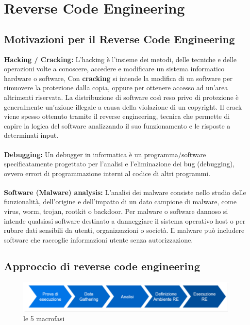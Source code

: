 \documentclass[8pt]{extarticle}
\begin{document}
\section{Reverse Code Engineering}
\subsection{Motivazioni per il Reverse Code Engineering}
\noindent
\textbf{Hacking / Cracking:}
L'hacking è l'insieme dei metodi, delle tecniche e delle operazioni volte a conoscere, accedere e 
modificare un sistema informatico hardware o software, Con \textbf{cracking} si intende la modifica di un 
software per rimuovere la protezione dalla copia, oppure per ottenere accesso ad un'area altrimenti 
riservata. La distribuzione di software così reso privo di protezione è generalmente un'azione 
illegale a causa della violazione di un copyright. Il crack viene spesso ottenuto tramite il 
reverse engineering, tecnica che permette di capire la logica del software analizzando il suo 
funzionamento e le risposte a determinati input.\\\\
\textbf{Debugging:}
Un debugger in informatica è un programma/software specificatamente progettato per l'analisi e 
l'eliminazione dei bug (debugging), ovvero errori di programmazione interni al codice di altri programmi.\\\\
\textbf{Software (Malware) analysis:}
L'analisi dei malware consiste nello studio delle funzionalità, dell'origine e dell'impatto di un dato 
campione di malware, come virus, worm, trojan, rootkit o backdoor. Per malware o software dannoso si 
intende qualsiasi software destinato a danneggiare il sistema operativo host o per rubare dati 
sensibili da utenti, organizzazioni o società. Il malware può includere software che raccoglie 
informazioni utente senza autorizzazione.
\subsection{Approccio di reverse code engineering}
\begin{figure}[H]
    \center
    \includegraphics[scale=0.3]{images/Macrofasi.png}
    \caption{le 5 macrofasi}\label{fig:1}
\end{figure}
\end{document}
